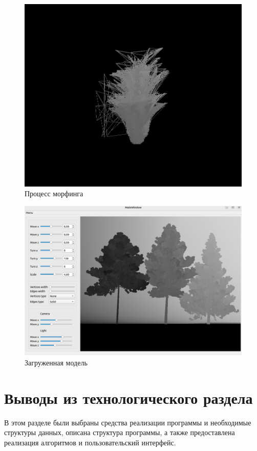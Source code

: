 \begin{figure}[H]
	\centering
	\includegraphics[scale=0.54]{images/morphing_process.png}
	\caption{Процесс морфинга}
	\label{fig:morphing_process}
\end{figure}

\begin{figure}[H]
	\centering
	\includegraphics[scale=0.54]{images/model.png}
	\caption{Загруженная модель}
	\label{fig:model}
\end{figure}


\section*{Выводы из технологического раздела}

В этом разделе были выбраны средства реализации программы и необходимые структуры данных, описана структура программы, а также предоставлена реализация алгоритмов и пользовательский интерфейс.
